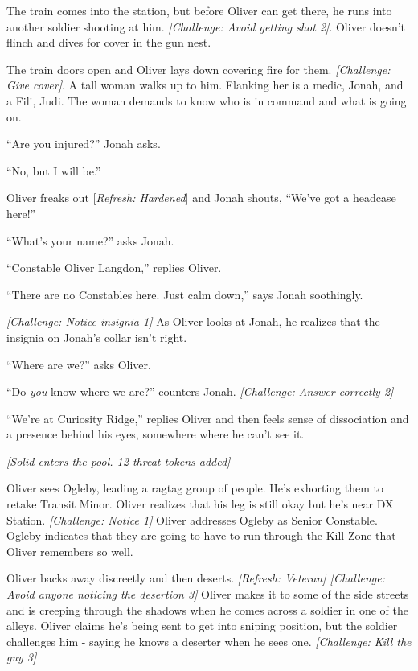 The train comes into the station, but before Oliver can get there, he runs into another soldier shooting at him. \textit{{[}Challenge: Avoid getting shot 2{]}}.  Oliver doesn't flinch and dives for cover in the gun nest.



The train doors open and Oliver lays down covering fire for them. \textit{{[}Challenge: Give cover{]}}.  A tall woman walks up to him.  Flanking her is a medic, Jonah, and a Fili, Judi.  The woman demands to know who is in command and what is going on.

``Are you injured?'' Jonah asks.

``No, but I will be.''



Oliver freaks out {[}\textit{Refresh: Hardened}{]} and Jonah shouts, ``We've got a headcase here!''

``What's your name?'' asks Jonah.

``Constable Oliver Langdon,'' replies Oliver.

``There are no Constables here.  Just calm down,'' says Jonah soothingly.



\textit{{[}Challenge: Notice insignia 1{]}}  As Oliver looks at Jonah, he realizes that the insignia on Jonah's collar isn't right.

``Where are we?'' asks Oliver. 

``Do \textit{you }know where we are?'' counters Jonah.  \textit{{[}Challenge: Answer correctly 2{]}}

``We're at Curiosity Ridge,'' replies Oliver and then feels sense of dissociation and a presence behind his eyes, somewhere where he can't see it.



\textit{{[}Solid enters the pool.  12 threat tokens added{]}}



Oliver sees Ogleby, leading a ragtag group of people.  He's exhorting them to retake Transit Minor.  Oliver realizes that his leg is still okay but he's near DX Station.  \textit{{[}Challenge: Notice 1{]}}  Oliver addresses Ogleby as Senior Constable.  Ogleby indicates that they are going to have to run through the Kill Zone that Oliver remembers so well.



Oliver backs away discreetly and then deserts. \textit{{[}Refresh: Veteran{]} {[}Challenge: Avoid anyone noticing the desertion 3{]}} Oliver makes it to some of the side streets and is creeping through the shadows when he comes across a soldier in one of the alleys.  Oliver claims he's being sent to get into sniping position, but the soldier challenges him - saying he knows a deserter when he sees one. \textit{{[}Challenge: Kill the guy 3{]}}



